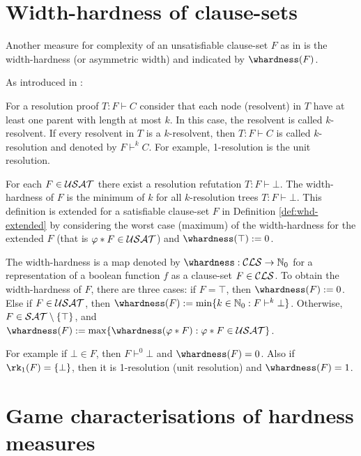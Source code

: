 \documentclass{report}
\begin{document}
\section{Width-hardness of clause-sets}
\label{sec:whdd}


Another measure for complexity of an unsatisfiable clause-set $F$ as in \cite{h18, h13} is the width-hardness (or asymmetric width) and indicated by $\whardness(F)$. 

As introduced in \cite{h19}:
\begin{defi}\label{def:kres}
For a resolution proof $T: F \vdash C$ consider that each node (resolvent) in $T$ have at least one parent with length at most $k$. In this case, the resolvent is called $k$-resolvent. If every resolvent in $T$ is a $k$-resolvent, then $T:F \vdash C$ is called $k$-resolution and denoted by $F \vdash^k C$. For example, 1-resolution is the unit resolution.
\end{defi}

For each $F \in \mathcal{USAT}$ there exist a resolution refutation $T:F \vdash \bot$. The width-hardness of $F$ is the minimum of $k$ for all $k$-resolution trees $T:F \vdash \bot$. This definition is extended for a satisfiable clause-set $F$ in Definition \ref{def:whd-extended} by considering the worst case (maximum) of the width-hardness for the extended $F$ (that is $ \varphi * F \in \mathcal{USAT}$) and $\whardness(\top):=0$.

\begin{defi}\label{def:whd-extended}
The width-hardness is a map denoted by $\whardness : \Cls \rightarrow \NNZ$ for a representation of a boolean function $f$ as a clause-set $F \in \mathcal{CLS}$. To obtain the width-hardness of  $F$, there are three cases: if $F = \top$, then $\whardness(F) := 0$. Else if $F \in \mathcal{USAT}$, then $\whardness(F) := \min \set{k \in \NNZ : F \vdash^k \bot}$. Otherwise, $F \in \mathcal{SAT} \setminus \{ \top \}$, and $\whardness(F) := \max \set{ \whardness(\vp * F) : \vp * F \in \Usat }$.
\end{defi}

For example if $\bot \in F$, then $F \vdash^0 \bot$ and $\whardness(F)=0$. Also if $\rk_1(F)=\set{\bot}$, then it is 1-resolution (unit resolution) and  $\whardness(F)=1$.

\section{Game characterisations of hardness measures}
\label{sec:game-pd}
\end{document}
